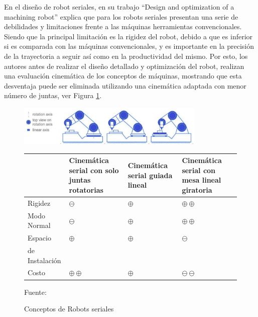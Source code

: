 En el diseño de robot seriales, \cite{denkena2017design} en su trabajo \enquote{Design and optimization of a machining robot} explica que para los robots seriales presentan una serie de debilidades y limitaciones frente a las máquinas herramientas convencionales. Siendo que la principal limitación es la rigidez del robot, debido a que es inferior si es comparada con las máquinas convencionales, y es importante en la precisión de la trayectoria a seguir así como en la productividad del mismo. Por esto, los autores antes de realizar el diseño detallado y optimización del robot, realizan una evaluación cinemática de los conceptos de máquinas, mostrando que esta desventaja puede ser eliminada utilizando una cinemática adaptada con menor número de juntas, ver Figura \ref{fig:07ConceptEvaluation}.

\begin{figure}[ht!]
    \centering
    \includegraphics[width=0.8\textwidth]{Cap2_DisenoEspecificaciones/Figura/07ConceptEvaluation.pdf}
    \begin{tabular}[c]{p{} | m{} | m{} | m{} |}
         & Cinemática serial con solo juntas rotatorias & Cinemática serial guiada lineal & Cinemática serial con mesa lineal giratoria \\ \hline
        Rigidez & $\ominus$ & $\oplus$ &  $\oplus \oplus$ \\ \hline
        Modo Normal & $\ominus$ & $\oplus$ &  $\oplus \oplus$ \\ \hline
        Espacio & $\oplus$ & $\oplus$ & $\ominus$ \\ 
        de Instalación & & & \\ \hline
        Costo & $\oplus \oplus$ & $\oplus$ &  $\ominus \ominus$ \\ \hline
    \end{tabular}
    \caption{Conceptos de Robots seriales}{Fuente:\citep{denkena2017design}}
    \label{fig:07ConceptEvaluation}
\end{figure}

